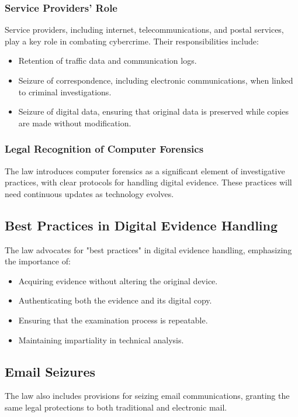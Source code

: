\subsubsection{Service Providers' Role}
Service providers, including internet, telecommunications, and postal services, play a key role in combating cybercrime. Their responsibilities include:
\begin{itemize}
    \item Retention of traffic data and communication logs.
    \item Seizure of correspondence, including electronic communications, when linked to criminal investigations.
    \item Seizure of digital data, ensuring that original data is preserved while copies are made without modification.
\end{itemize}

\subsubsection{Legal Recognition of Computer Forensics}
The law introduces computer forensics as a significant element of investigative practices, with clear protocols for handling digital evidence. These practices will need continuous updates as technology evolves.

\subsection{Best Practices in Digital Evidence Handling}
The law advocates for "best practices" in digital evidence handling, emphasizing the importance of:
\begin{itemize}
    \item Acquiring evidence without altering the original device.
    \item Authenticating both the evidence and its digital copy.
    \item Ensuring that the examination process is repeatable.
    \item Maintaining impartiality in technical analysis.
\end{itemize}

\subsection{Email Seizures}
The law also includes provisions for seizing email communications, granting the same legal protections to both traditional and electronic mail.

